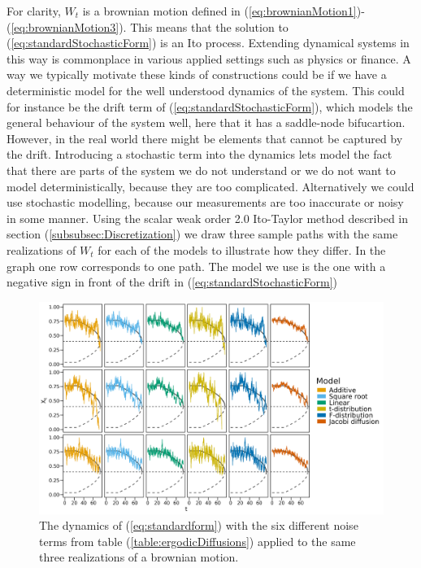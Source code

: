 For clarity, $W_t$ is a brownian motion defined in (\ref{eq:brownianMotion1})-(\ref{eq:brownianMotion3}). This means that the solution to (\ref{eq:standardStochasticForm}) is an Ito process. Extending dynamical systems in this way is commonplace in various applied settings such as physics or finance. A way we typically motivate these kinds of constructions could be if we have a deterministic model for the well understood dynamics of the system. This could for instance be the drift term of (\ref{eq:standardStochasticForm}), which models the general behaviour of the system well, here that it has a saddle-node bifucartion. However, in the real world there might be elements that cannot be captured by the drift. Introducing a stochastic term into the dynamics lets model the fact that there are parts of the system we do not understand or we do not want to model deterministically, because they are too complicated. Alternatively we could use stochastic modelling, because our measurements are too inaccurate or noisy in some manner. Using the scalar weak order 2.0 Ito-Taylor method described in section (\ref{subsubsec:Discretization}) we draw three sample paths with the same realizations of $W_t$ for each of the models to illustrate how they differ. In the graph one row corresponds to one path. The model we use is the one with a negative sign in front of the drift in (\ref{eq:standardStochasticForm})
\begin{figure}[h]
    \begin{center}
        \includegraphics[scale = .1]{figures/sample_paths_plot_small_scale.jpeg}
        \caption{The dynamics of (\ref{eq:standardform}) with the six different noise terms from table (\ref{table:ergodicDiffusions}) applied to the same three realizations of a brownian motion.}
        \label{figure:samplesFromAllDifferentModels}
    \end{center}
\end{figure}\\
